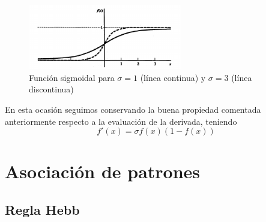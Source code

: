 \begin{figure}[hbtp]
\centering
\includegraphics[width = 0.6\textwidth]{img/sigmoidalCambioSigma.png}
\caption{Función sigmoidal para $σ=1$ (línea continua) y $σ=3$ (línea discontinua)}
\label{fig:sigmoidalCambioSigma}
\end{figure}

En esta ocasión seguimos conservando la buena propiedad comentada anteriormente respecto a la evaluación de la derivada, teniendo
\[f'(x) = σf(x)(1-f(x))\]

\section{Asociación de patrones}
\subsection{Regla Hebb}

